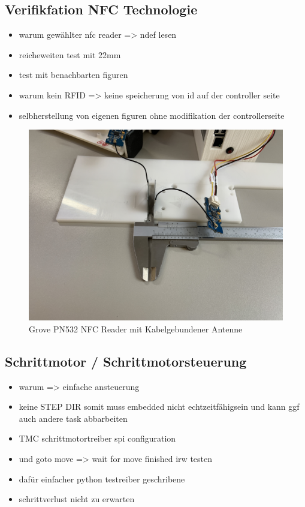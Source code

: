 \hypertarget{verifikfation-nfc-technologie}{%
\subsection{Verifikfation NFC
Technologie}\label{verifikfation-nfc-technologie}}

\begin{itemize}
\tightlist
\item
  warum gewählter nfc reader =\textgreater{} ndef lesen
\item
  reicheweiten test mit 22mm
\item
  test mit benachbarten figuren
\item
  warum kein RFID =\textgreater{} keine speicherung von id auf der
  controller seite
\item
  selbherstellung von eigenen figuren ohne modifikation der
  controllerseite
\end{itemize}

\begin{figure}
\centering
\includegraphics{images/ATC_nfc_range_test.JPG}
\caption{Grove PN532 NFC Reader mit Kabelgebundener Antenne}
\end{figure}

\hypertarget{schrittmotor-schrittmotorsteuerung}{%
\subsection{Schrittmotor /
Schrittmotorsteuerung}\label{schrittmotor-schrittmotorsteuerung}}

\begin{itemize}
\tightlist
\item
  warum =\textgreater{} einfache ansteuerung
\item
  keine STEP DIR somit muss embedded nicht echtzeitfähigsein und kann
  ggf auch andere task abbarbeiten
\item
  TMC schrittmotortreiber spi configuration
\item
  und goto move =\textgreater{} wait for move finished irw testen
\item
  dafür einfacher python testreiber geschribene
\item
  schrittverlust nicht zu erwarten
\end{itemize}

